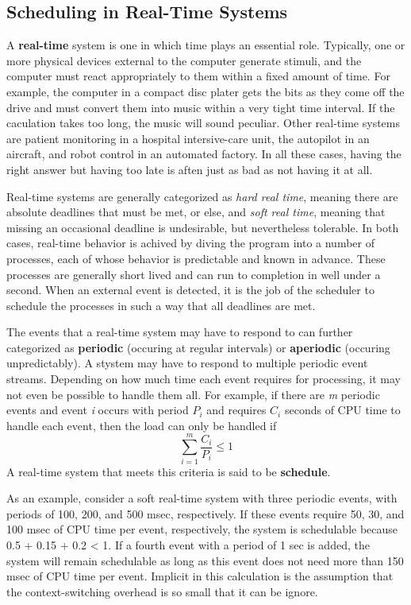 \documentclass{book}
\newcommand {\kw}  [1] {\textbf{#1}}
\newcommand {\sys} [1] {\textsl{#1}}
\begin{document}
\subsection{Scheduling in Real-Time Systems}
A \kw{real-time} system is one in which time plays an essential role.
Typically, one or more physical devices external to the computer generate stimuli, 
and the computer must react appropriately to them within a fixed amount of time.
For example, the computer in a compact disc plater gets the bits as they come off the drive 
and must convert them into music within a very tight time interval.
If the caculation takes too long, the music will sound peculiar.
Other real-time systems are patient monitoring in a hospital intersive-care unit, 
the autopilot in an aircraft, and robot control in an automated factory.
In all these cases, having the right answer but having too late is aften just as bad as not having it at all.

Real-time systems are generally categorized as \sys{hard real time}, meaning there are absolute deadlines that must be met,
or else, and \sys{soft real time}, meaning that missing an occasional deadline is undesirable, but nevertheless tolerable.
In both cases, real-time behavior is achived by diving the program into a number of processes, 
each of whose behavior is predictable and known in advance.
These processes are generally short lived and can run to completion in well under a second.
When an external event is detected, it is the job of the scheduler to schedule the processes in such a way that all deadlines are met.

The events that a real-time system may have to respond to can further categorized as 
\kw{periodic} (occuring at regular intervals) or \kw{aperiodic} (occuring unpredictably).
A stystem may have to respond to multiple periodic event streams.
Depending on how much time each event requires for processing, 
it may not even be possible to handle them all.
For example, if there are \sys{m} periodic events and event \sys{i} occurs 
with period \(P_i\) and requires \(C_i\) seconds of CPU time to handle each event, 
then the load can only be handled if 
\[
\sum_{i=1}^{m}\frac{C_i}{P_i}\leq1
\]
A real-time system that meets this criteria is said to be \kw{schedule}.

As an example, consider a soft real-time system with three periodic events,
with periods of 100, 200, and 500 msec, respectively.
If these events require 50, 30, and 100 msec of CPU time per event, respectively, the system is schedulable because 0.5 + 0.15 + 0.2 < 1.
If a fourth event with a period of 1 sec is added, 
the system will remain schedulable as long as this event does not need more than 150 msec of CPU time per event.
Implicit in this calculation is the assumption that the context-switching overhead is so small that it can be ignore.
\end{document}
